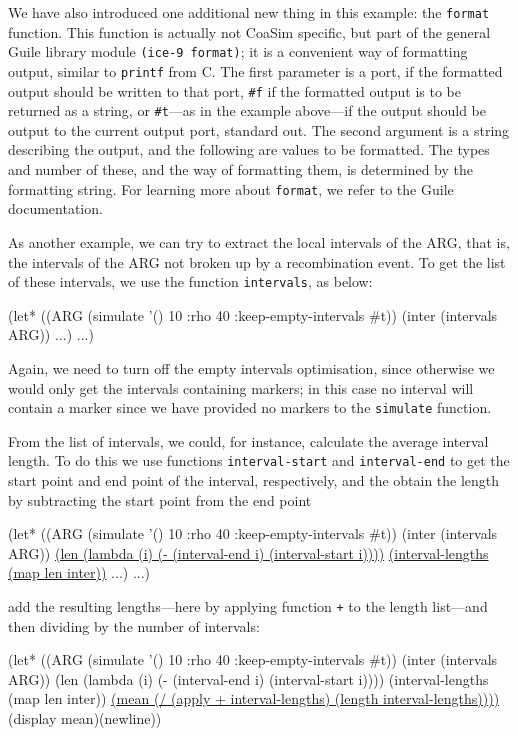 \documentclass{manual}
\begin{document}
\begin{empfile}
We have also introduced one additional new thing in this example: the
\texttt{format} function.  This function is actually not CoaSim
specific, but part of the general Guile library module \texttt{(ice-9
  format)}; it is a convenient way of formatting output, similar to
\texttt{printf} from C.  The first parameter is a port, if the
formatted output should be written to that port, \texttt{\#f} if the
formatted output is to be returned as a string, or \texttt{\#t}---as
in the example above---if the output should be output to the current
output port, standard out.  The second argument is a string describing
the output, and the following are values to be formatted.  The types
and number of these, and the way of formatting them, is determined by
the formatting string.  For learning more about \texttt{format}, we
refer to the Guile documentation.

As another example, we can try to extract the local intervals of the
ARG, that is, the intervals of the ARG not broken up by a
recombination event.  To get the list of these intervals, we use the
function \texttt{intervals}, as below:
\begin{code}
(let* ((ARG (simulate '() 10 :rho 40 :keep-empty-intervals #t))
       (inter (intervals ARG))
       ...)
    ...)
\end{code}
Again, we need to turn off the empty intervals optimisation, since
otherwise we would only get the intervals containing markers; in this
case no interval will contain a marker since we have provided no
markers to the \texttt{simulate} function.

From the list of intervals, we could, for instance, calculate the
average interval length.  To do this we use functions
\texttt{interval-start} and \texttt{interval-end} to get the start
point and end point of the interval, respectively, and the obtain the
length by subtracting the start point from the end point
\begin{code}
(let* ((ARG (simulate '() 10 :rho 40 :keep-empty-intervals #t))
       (inter (intervals ARG))
       \underline{(len (lambda (i) (- (interval-end i) (interval-start i))))}
       \underline{(interval-lengths (map len inter))}
       ...)
    ...)
\end{code}
add the resulting lengths---here by applying function \texttt{+} to
the length list---and then dividing by the number of intervals:
\begin{code}
(let* ((ARG (simulate '() 10 :rho 40 :keep-empty-intervals #t))
       (inter (intervals ARG))
       (len (lambda (i) (- (interval-end i) (interval-start i))))
       (interval-lengths (map len inter))
       \underline{(mean (/ (apply + interval-lengths) (length interval-lengths))))}
  (display mean)(newline))
\end{code}



\end{empfile}
\end{document}
